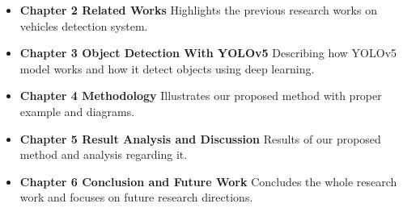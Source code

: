    \begin{itemize}
       
       \item\textbf{Chapter 2 Related Works}  Highlights the previous research works on vehicles detection system.
       
        \item\textbf{Chapter 3 Object Detection With YOLOv5} Describing how YOLOv5 model works and how it detect objects using deep learning. 
       
        \item\textbf{Chapter 4 Methodology} Illustrates our proposed method with proper example and diagrams. 
       
       \item\textbf{Chapter 5 Result Analysis and Discussion} Results of our proposed method and analysis regarding it.
       
       \item\textbf{Chapter 6 Conclusion and Future Work} Concludes the whole research work and focuses on future research directions.
       
       
       
   \end{itemize}




























 